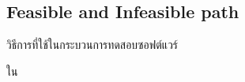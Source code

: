 \subsection{Feasible and Infeasible path}

วิธีการที่ใช้ในกระบวนการทดสอบซอฟต์แวร์

{\FeasiblePath}ใน{\sourcecode}
